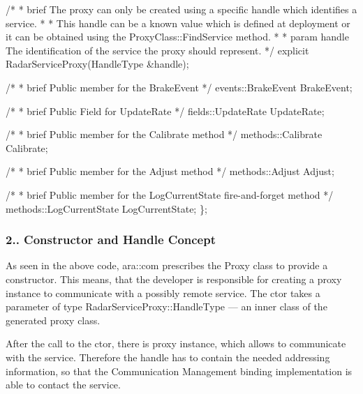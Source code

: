 \begin{DoxyItemize}
\begin{DoxyCode}
  \textcolor{comment}{/*}
\textcolor{comment}{   * brief The proxy can only be created using a specific handle which}
\textcolor{comment}{    identifies a service.}
\textcolor{comment}{   *}
\textcolor{comment}{   * This handle can be a known value which is defined at deployment or it }
\textcolor{comment}{     can be obtained using the ProxyClass::FindService method.}
\textcolor{comment}{   *}
\textcolor{comment}{   * param handle The identification of the service the proxy should represent.}
\textcolor{comment}{   */}
  \textcolor{keyword}{explicit} RadarServiceProxy(HandleType &handle);

  \textcolor{comment}{/*}
\textcolor{comment}{   * brief Public member for the BrakeEvent}
\textcolor{comment}{   */}
  events::BrakeEvent BrakeEvent;

  \textcolor{comment}{/*}
\textcolor{comment}{   * brief Public Field for UpdateRate}
\textcolor{comment}{   */}
  fields::UpdateRate UpdateRate;

  \textcolor{comment}{/*}
\textcolor{comment}{   * brief Public member for the Calibrate method}
\textcolor{comment}{   */}
  methods::Calibrate Calibrate;

  \textcolor{comment}{/*}
\textcolor{comment}{   * brief Public member for the Adjust method}
\textcolor{comment}{   */}
  methods::Adjust Adjust;

  \textcolor{comment}{/*}
\textcolor{comment}{   * brief Public member for the LogCurrentState fire-and-forget method}
\textcolor{comment}{   */}
  methods::LogCurrentState LogCurrentState;
\};
\end{DoxyCode}

\end{DoxyItemize}

\subsubsection*{2.. Constructor and Handle Concept}


\begin{DoxyItemize}
\item As seen in the above code, ara\+::com prescribes the Proxy class to provide a constructor. This means, that the developer is responsible for creating a proxy instance to communicate with a possibly remote service. The ctor takes a parameter of type Radar\+Service\+Proxy\+::\+Handle\+Type — an inner class of the generated proxy class.
\item After the call to the ctor, there is proxy instance, which allows to communicate with the service. Therefore the handle has to contain the needed addressing information, so that the Communication Management binding implementation is able to contact the service.
\end{DoxyItemize}

